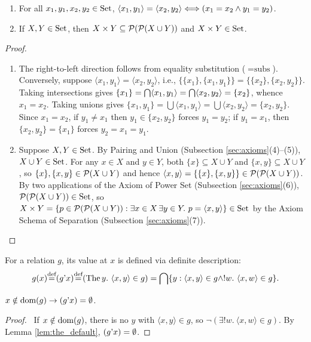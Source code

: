 \documentclass[10pt,a4paper]{article}
\renewcommand{\myprf}{\begin{proof}}
\renewcommand{\myqed}{\end{proof}}
\begin{document}
\begin{lemma}\label{lem:pair_prop}
\begin{enumerate}
\item For all $x_1, y_1, x_2, y_2 \in {\textrm{Set}}$, $\langle x_1, y_1 \rangle = \langle x_2, y_2 \rangle \Longleftrightarrow (x_1 = x_2 \land y_1 = y_2)$.
\item If $X, Y \in {\textrm{Set}}$, then $X \times Y \subseteq {\mathcal{P}}({\mathcal{P}}(X \cup Y))$ and $X \times Y \in {\textrm{Set}}$.
\end{enumerate}
\end{lemma}
\myprf
\begin{enumerate}
\item The right-to-left direction follows from equality substitution ($=\textrm{subs}$). Conversely, suppose $\langle x_1, y_1 \rangle = \langle x_2, y_2 \rangle$, i.e., $\{\{x_1\}, \{x_1, y_1\}\} = \{\{x_2\}, \{x_2, y_2\}\}$. Taking intersections gives $\{x_1\} = {\bigcap} \langle x_1, y_1 \rangle = {\bigcap} \langle x_2, y_2 \rangle = \{x_2\}$, whence $x_1 = x_2$. Taking unions gives $\{x_1, y_1\} = \bigcup \langle x_1, y_1 \rangle = \bigcup \langle x_2, y_2 \rangle = \{x_2, y_2\}$. Since $x_1 = x_2$, if $y_1 \neq x_1$ then $y_1 \in \{x_2, y_2\}$ forces $y_1 = y_2$; if $y_1 = x_1$, then $\{x_2, y_2\} = \{x_1\}$ forces $y_2 = x_1 = y_1$.
\item Suppose $X, Y \in {\textrm{Set}}$. By Pairing and Union (Subsection \ref{sec:axioms}(4)--(5)), $X \cup Y \in {\textrm{Set}}$. For any $x \in X$ and $y \in Y$, both $\{x\} \subseteq X \cup Y$ and $\{x, y\} \subseteq X \cup Y$, so $\{x\}, \{x, y\} \in {\mathcal{P}}(X \cup Y)$ and hence $\langle x, y \rangle = \{\{x\}, \{x, y\}\} \in {\mathcal{P}}({\mathcal{P}}(X \cup Y))$. By two applications of the Axiom of Power Set (Subsection \ref{sec:axioms}(6)), ${\mathcal{P}}({\mathcal{P}}(X \cup Y)) \in {\textrm{Set}}$, so $X \times Y = \{p \in {\mathcal{P}}({\mathcal{P}}(X \cup Y)) : \exists x \in X\, \exists y \in Y.\ p = \langle x, y \rangle\} \in {\textrm{Set}}$ by the Axiom Schema of Separation (Subsection \ref{sec:axioms}(7)).
\end{enumerate}
\myqed

For a relation $g$, its value at $x$ is defined via definite description:
$$g(x) {\stackrel{{\textrm{def}}}{=}} (g{\textrm{'}} x) {\stackrel{{\textrm{def}}}{=}} ({\textrm{The\,}} y.\ \langle x, y\rangle \in g) = {\bigcap} \{y : \langle x,y\rangle \in g \land !w.\ \langle x,w\rangle \in g\}.$$

\begin{exercise}
$x\notin {\textrm{dom}}(g)\to (g{\textrm{'}} x)=\emptyset$.
\end{exercise}
\myprf\ If $x \notin {\textrm{dom}}(g)$, there is no $y$ with $\langle x,y\rangle \in g$, so $\neg(\exists !w.\ \langle x,w\rangle \in g)$. By Lemma \ref{lem:the_default}, $(g{\textrm{'}} x) = \emptyset$. \myqed
\end{document}
